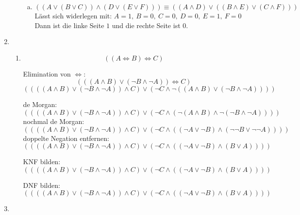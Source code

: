 \documentclass[a4paper]{scrartcl}
\newcommand{\aufgabe}[1]{\item[\textbf{#1}]}
\begin{document}
\begin{enumerate}
\begin{enumerate}[1.]
\begin{enumerate}[a)]
   \item
   $$((A\vee(B\vee C))\wedge(D\vee(E\vee F))) \equiv ((A\wedge D)\vee ((B\wedge E)\vee(C\wedge F)))$$
   Lässt sich widerlegen mit: $A=1,\ B=0,\ C=0,\ D=0,\ E=1,\ F=0$\\
   Dann ist die linke Seite $1$ und die rechte Seite ist $0$.

  \end{enumerate}

\end{enumerate}

\aufgabe{6.4}

\begin{enumerate}[1.]
 \item
  $$((A\Leftrightarrow B)\Leftrightarrow C)$$

  Elimination von $\Leftrightarrow$:
  $$(((A\wedge B)\vee(\neg B\wedge\neg A))\Leftrightarrow C)$$
  $$((((A\wedge B)\vee(\neg B\wedge\neg A))\wedge C)\vee(\neg C\wedge\neg((A\wedge B)\vee(\neg B\wedge\neg A))) )$$

  de Morgan:
  $$((((A\wedge B)\vee(\neg B\wedge\neg A))\wedge C) \vee(\neg C\wedge(\neg(A\wedge B)\wedge\neg(\neg B\wedge\neg A))))$$
  nochmal de Morgan:
  $$((((A\wedge B)\vee(\neg B\wedge\neg A))\wedge C) \vee(\neg C\wedge((\neg A\vee \neg B)\wedge(\neg\neg B\vee\neg\neg A))))$$
  doppelte Negation entfernen:
  $$((((A\wedge B)\vee(\neg B\wedge\neg A))\wedge C) \vee(\neg C\wedge((\neg A\vee \neg B)\wedge(B\vee A))))$$

  KNF bilden: %
  $$((((A\wedge B)\vee(\neg B\wedge\neg A))\wedge C) \vee(\neg C\wedge((\neg A\vee \neg B)\wedge(B\vee A))))$$

  DNF bilden: %
  $$((((A\wedge B)\vee(\neg B\wedge\neg A))\wedge C) \vee(\neg C\wedge((\neg A\vee \neg B)\wedge(B\vee A))))$$

\end{enumerate}


\aufgabe{6.5}


\end{enumerate}
\end{document}
